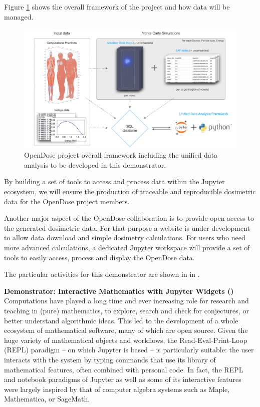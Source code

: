   Figure \ref{fig:opendose_framework} shows the overall framework of the
  project and how data will be managed.

  \begin{figure}[t!]
    \centering
    \includegraphics[width=1.0\textwidth]{images/opendose_framework.pdf}
    \caption{OpenDose project overall framework including the unified data
    analysis to be developed in this demonstrator.}
    \label{fig:opendose_framework}
  \end{figure}

  By building a set of tools to access and process data within the Jupyter
  ecosystem, we will ensure the production of traceable and reproducible
  dosimetric data for the OpenDose project members.

  Another major aspect of the OpenDose collaboration is to provide open
  access to the generated dosimetric data. For that purpose a website is under
  development to allow data download and simple dosimetry calculations. For
  users who need more advanced calculations, a dedicated Jupyter workspace will
  provide a set of tools to easily access, process and display the OpenDose
  data.

  The particular activities for this demonstrator are shown in
   in .

\medskip
\noindent\textbf{Demonstrator: Interactive Mathematics with Jupyter Widgets ()}\label{sec:concept-demonstrator-math}\\
  Computations have played a long time and ever increasing role for
  research and teaching in (pure) mathematics, to explore, search and
  check for conjectures, or better understand algorithmic ideas. This
  led to the development of a whole ecosystem of mathematical
  software, many of which are open source. Given the huge variety of
  mathematical objects and workflows, the Read-Eval-Print-Loop (REPL)
  paradigm -- on which Jupyter is based -- is particularly suitable:
  the user interacts with the system by typing commands that use its
  library of mathematical features, often combined with personal code.
  In fact, the REPL and notebook paradigms of Jupyter as well as some
  of its interactive features were largely inspired by that of
  computer algebra systems such as Maple, Mathematica, or SageMath.

